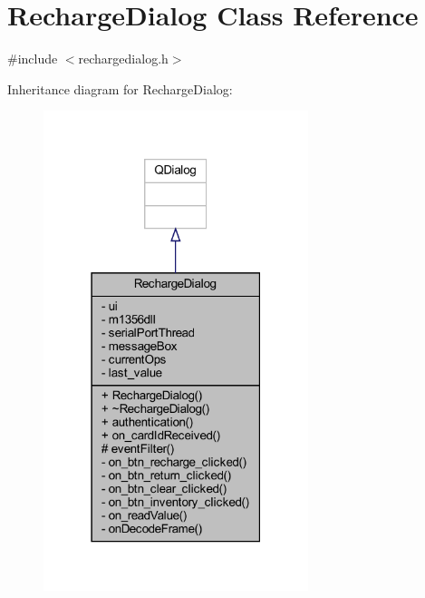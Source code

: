 \hypertarget{class_recharge_dialog}{}\section{Recharge\+Dialog Class Reference}
\label{class_recharge_dialog}


{\ttfamily \#include $<$rechargedialog.\+h$>$}



Inheritance diagram for Recharge\+Dialog\+:
\nopagebreak
\begin{figure}[H]
\begin{center}
\leavevmode
\includegraphics[width=219pt]{class_recharge_dialog__inherit__graph}
\end{center}
\end{figure}



